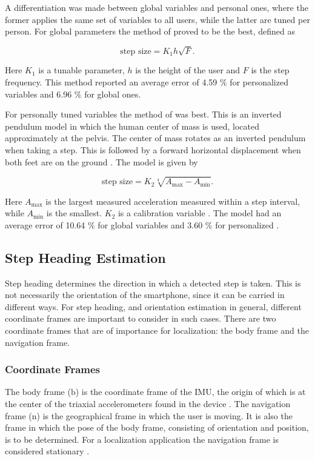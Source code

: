 A differentiation was made between global variables and personal ones, where the former applies the same set of variables to all users, while the latter are tuned per person. For global parameters the method of \citet{Tian2016} proved to be the best, defined as

\begin{equation}
	\label{eq:Tian2016_sle}
	\text{step size} = K_1 h \sqrt{F}.
\end{equation}

Here $K_1$ is a tunable parameter, $h$ is the height of the user and $F$ is the step frequency. This method reported an average error of  4.59 \% for personalized variables and 6.96 \% for global ones. \par 

For personally tuned variables the method of \citet{Weinberg2002} was best. This is an inverted pendulum model in which the human center of mass is used, located approximately at the pelvis. The center of mass rotates as an inverted pendulum when taking a step. This is followed by a forward horizontal displacement when both feet are on the ground \cite{Diez2018}. The model is given by

\begin{equation}
\text{step size} =K_2 \sqrt[4]{A_{\max }-A_{\min }}.
\label{eq:weinberg_stepsize}
\end{equation}

Here $A_{\max}$ is the largest measured acceleration measured within a step interval, while $A_{\min}$ is the smallest. $K_2$ is a calibration variable  \cite{Weinberg2002,Diez2018}. The model had an average error of  10.64 \% for global variables and  3.60 \% for personalized \cite{Vezocnik2019}.

\subsection{Step Heading Estimation}
\label{sec:rw-step_heading_estimation}
Step heading determines the direction in which a detected step is taken. This is not necessarily the orientation of the smartphone, since it can be carried in different ways. For step heading, and orientation estimation in general, different coordinate frames are important to consider in such cases. There are two coordinate frames that are of importance for localization: the body frame and the navigation frame.\par 

\subsubsection{Coordinate Frames}
The body frame ($\mathrm{b}$) is the coordinate frame of the IMU, the origin of which is at the center of the triaxial accelerometers found in the device \cite{Kok2017}. The navigation frame ($\mathrm{n}$) is the geographical frame in which the user is moving. It is also the frame in which the pose of the body frame, consisting of orientation and position, is to be determined. For a localization application the navigation frame is considered stationary \cite{Kok2017}.\par

